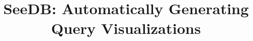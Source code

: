 \documentclass{vldb}
\begin{document}
\newcommand{\agp}[1]{\textcolor{red}{Aditya: #1}}
\newcommand{\SeeDB}{{\sc SeeDB}}
\newcommand{\calQ}{\mathcal{Q}}
\newcommand{\calR}{\mathcal{R}}
\newcommand{\att}[1]{{\text{#1}}}

\newtheorem{definition}{Definition}[section]
\newtheorem{example}[definition]{Example}
\newtheorem{problem}{Problem}[section]
\renewcommand{\baselinestretch}{0.995}





\newcommand{\squishlist}{
   \begin{list}{$\bullet$}
    { \setlength{\itemsep}{0pt}
      \setlength{\parsep}{2pt}
      \setlength{\topsep}{0pt}
      \setlength{\partopsep}{0pt}
      \leftmargin=25pt
\rightmargin=0pt
\labelsep=5pt
\labelwidth=10pt
\itemindent=0pt
\listparindent=0pt
\itemsep=\parsep
    }
}
\newcommand{\squishend}{\end{list}}

\newenvironment{denselist}{
    \begin{list}{\tiny{$\bullet$}}%
    {\setlength{\itemsep}{0ex} \setlength{\topsep}{0ex}
    \setlength{\parsep}{0pt} \setlength{\itemindent}{0pt}
    \setlength{\leftmargin}{0.5em}
    \setlength{\partopsep}{0pt}}}%
    {\end{list}}

\newcommand{\eat}[1]{}
\newcommand{\papertext}[1]{#1}
\newcommand{\techreport}[1]{}

\newcommand{\techreporttext}[1]{}
\newcommand{\stitle}[1]{\vspace{0.25em}\noindent\textbf{#1}}




\title{{\LARGE \sc SeeDB}: Automatically Generating Query Visualizations}

 
\end{document}
